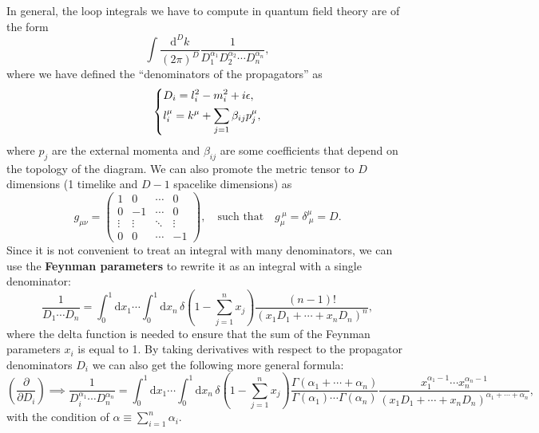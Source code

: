 In general, the loop integrals we have to compute in quantum field theory are of the form
\[
    \int \frac{\mathrm{d}^D k}{(2\pi)^D} \frac{1}{D_1^{\alpha_1} D_2^{\alpha_2} \cdots D_n^{\alpha_n}},
\]
where we have defined the ``denominators of the propagators'' as
\[
    \begin{dcases}
        D_i = l_i^2 - m_i^2 + i\epsilon, \\
        l_i^{\mu} = k^{\mu} + \sum_{j=1} \beta_{ij} p_j^{\mu},
    \end{dcases}
\]
where \(p_j\) are the external momenta and \(\beta_{ij}\) are some coefficients that depend on the topology of the diagram. We can also promote the metric tensor to \(D\) dimensions (1 timelike and \(D-1\) spacelike dimensions) as
\[
    g_{\mu \nu} = \begin{pmatrix}
        1      & 0      & \cdots & 0      \\
        0      & -1     & \cdots & 0      \\
        \vdots & \vdots & \ddots & \vdots \\
        0      & 0      & \cdots & -1
    \end{pmatrix}, \quad \text{such that} \quad g_{\mu}^{\ \mu} = \delta^{\mu}_{\ \mu} = D.
\]
Since it is not convenient to treat an integral with many denominators, we can use the \textbf{Feynman parameters} to rewrite it as an integral with a single denominator:
\[
    \frac{1}{D_1 \cdots D_n} = \int_0^1 \mathrm{d} x_1 \cdots \int_0^1 \mathrm{d} x_n \, \delta\left( 1 - \sum_{j=1}^n x_j\right) \frac{(n-1)!}{\left( x_1 D_1 + \cdots + x_n D_n\right)^n},
\]
where the delta function is needed to ensure that the sum of the Feynman parameters \(x_i\) is equal to 1. By taking derivatives with respect to the propagator denominators \(D_i\) we can also get the following more general formula:
\[
    \left(\frac{\partial}{\partial D_i}\right) \implies \frac{1}{D_i^{\alpha_1} \cdots D_n^{\alpha_n}} = \int_0^1 \mathrm{d} x_1 \cdots \int_0^1 \mathrm{d} x_n \, \delta\left( 1 - \sum_{j=1}^n x_j\right) \frac{\Gamma(\alpha_1 + \cdots + \alpha_n)}{\Gamma(\alpha_1) \cdots \Gamma(\alpha_n)} \frac{x_1^{\alpha_1 - 1} \cdots x_n^{\alpha_n - 1}}{\left( x_1 D_1 + \cdots + x_n D_n\right)^{\alpha_1 + \cdots + \alpha_n}},
\]
with the condition of \(\alpha \equiv \sum_{i=1}^n \alpha_i\).

